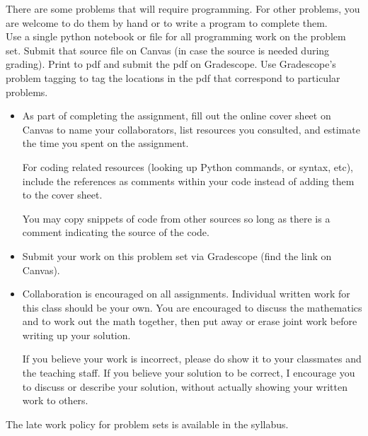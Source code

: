 \documentclass[12pt,letterpaper,noanswers]{exam}
\begin{document}
 \pdfpageheight 11in 
  \pdfpagewidth 8.5in

  
\noindent There are some problems that will require programming.  For other problems, you are welcome to do them by hand or to write a program to complete them. \\

\noindent Use a single python notebook or file for all programming work on the problem set.  Submit that source file on Canvas (in case the source is needed during grading).  Print to pdf and submit the pdf on Gradescope.  Use Gradescope's problem tagging to tag the locations in the pdf that correspond to particular problems.


\begin{itemize}
\item As part of completing the assignment, fill out the online cover sheet on Canvas to name your collaborators, list resources you consulted, and estimate the time you spent on the assignment.

For coding related resources (looking up Python commands, or syntax, etc), include the references as comments within your code instead of adding them to the cover sheet.

You may copy snippets of code from other sources so long as there is a comment indicating the source of the code.
\item Submit your work on this problem set via Gradescope (find the link on Canvas).
\item Collaboration is encouraged on all assignments.  Individual written work for this class should be your own.  You are encouraged to discuss the mathematics and to work out the math together, then put away or erase joint work before writing up your solution.  

If you believe your work is incorrect, please do show it to your classmates and the teaching staff.  If you believe your solution to be correct, I encourage you to discuss or describe your solution, without actually showing your written work to others.
\end{itemize}

The late work policy for problem sets is available in the syllabus.
 

\end{document}
